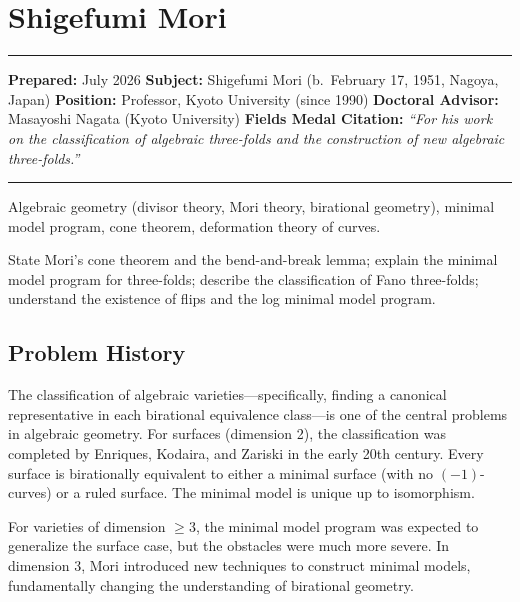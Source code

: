 \chapter{Shigefumi Mori}\label{ch1990shigefumimori:shigefumi-mori-fields-medal-1990-a-comprehensive-report}

\begin{center}\rule{0.5\linewidth}{0.5pt}\end{center}

\textbf{Prepared:} July 2026 \textbf{Subject:} Shigefumi Mori (b.~February 17, 1951, Nagoya, Japan)
\textbf{Position:} Professor, Kyoto University (since 1990)
\textbf{Doctoral Advisor:} Masayoshi Nagata (Kyoto University)
\textbf{Fields Medal Citation:} \emph{``For his work on the classification of algebraic three-folds and the construction of new algebraic three-folds.''}

\begin{center}\rule{0.5\linewidth}{0.5pt}\end{center}

\begin{prereqs}
Algebraic geometry (divisor theory, Mori theory, birational geometry),
minimal model program, cone theorem, deformation theory of curves.
\end{prereqs}

\begin{objectives}
State Mori's cone theorem and the bend-and-break lemma;
explain the minimal model program for three-folds;
describe the classification of Fano three-folds;
understand the existence of flips and the log minimal model program.
\end{objectives}

\section{Problem History}

The classification of algebraic varieties---specifically, finding a canonical
representative in each birational equivalence class---is one of the central
problems in algebraic geometry. For surfaces (dimension 2), the classification
was completed by Enriques, Kodaira, and Zariski in the early 20th century.
Every surface is birationally equivalent to either a minimal surface (with no
$(-1)$-curves) or a ruled surface. The minimal model is unique up to
isomorphism.

For varieties of dimension $\geq 3$, the minimal model program was expected to
generalize the surface case, but the obstacles were much more severe. In
dimension 3, Mori \cite{mori1982} introduced new techniques to construct minimal models,
fundamentally changing the understanding of birational geometry.

